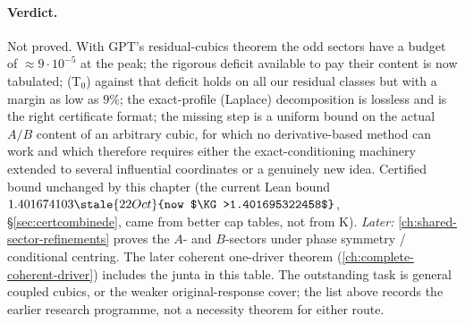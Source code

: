 \paragraph{Verdict.} Not proved. With GPT's residual-cubics theorem the odd sectors have a budget of $\approx9\cdot10^{-5}$ at the peak; the rigorous deficit available to pay their
content is now tabulated; (T$_0$) against that deficit holds on all our residual classes but with a margin as low as $9\%$; the exact-profile (Laplace) decomposition is lossless
and is the right certificate format; the missing step is a uniform bound on the actual $A/B$ content of an arbitrary cubic, for which no derivative-based method can work and
which therefore requires either the exact-conditioning machinery extended to several influential coordinates or a genuinely new idea. Certified bound unchanged by this chapter
(the current Lean bound $1.401674103\stale{22 Oct}{now $\KG>1.401695322458$}$, \S\ref{sec:certcombinede}, came from better cap tables, not from K). \emph{Later:} \autoref{ch:shared-sector-refinements}
proves the $A$- and $B$-sectors under phase symmetry / conditional centring. The later coherent one-driver theorem (\autoref{ch:complete-coherent-driver}) includes the junta in this table. The outstanding task is general coupled cubics, or the weaker original-response cover; the list above records the earlier research programme, not a necessity theorem for either route.
